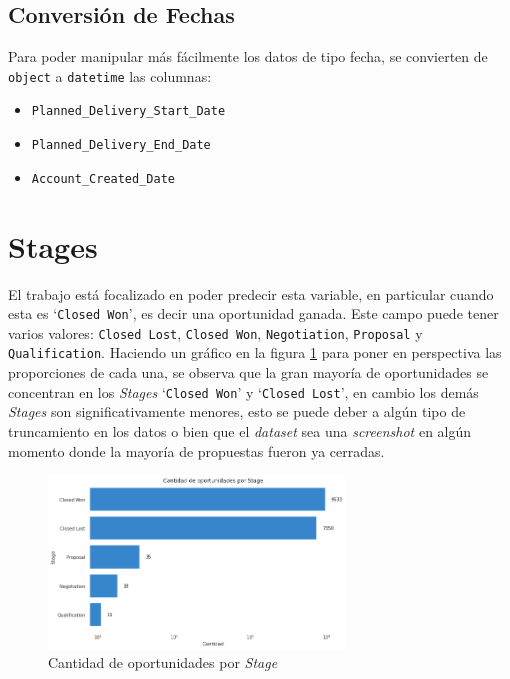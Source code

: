 \documentclass[titlepage,a4paper]{article}
\begin{document}
\subsection{Conversión de Fechas}
Para poder manipular más fácilmente los datos de tipo fecha, se convierten de \verb|object| a \verb|datetime| las columnas:
\begin{itemize}
    \item \verb|Planned_Delivery_Start_Date|
    \item \verb|Planned_Delivery_End_Date|
    \item \verb|Account_Created_Date|
\end{itemize}


\section{\textbf {Stages}}
El trabajo está focalizado en poder predecir esta variable, en particular cuando esta es `\verb|Closed Won|', es decir una oportunidad ganada. Este campo puede tener varios valores: \verb|Closed Lost|, \verb|Closed Won|, \verb|Negotiation|, \verb|Proposal| y \verb|Qualification|. Haciendo un gráfico en la figura \ref{fig:bp_cant_opp_por_stage} para poner en perspectiva las proporciones de cada una, se observa que la gran mayoría de oportunidades se concentran en los \textit{Stages} `\verb|Closed Won|' y `\verb|Closed Lost|', en cambio los demás \textit{Stages} son significativamente menores, esto se puede deber a algún tipo de truncamiento en los datos o bien que el \textit{dataset} sea una \textit{screenshot} en algún momento donde la mayoría de propuestas fueron ya cerradas.

\begin{figure}[H]
\centering
\includegraphics[width=0.7\textwidth]{images/bp_cantidad_opp_por_stage_log.png}
\cprotect\caption{\label{fig:bp_cant_opp_por_stage}Cantidad de oportunidades por \textit{Stage}}
\end{figure}
\end{document}
